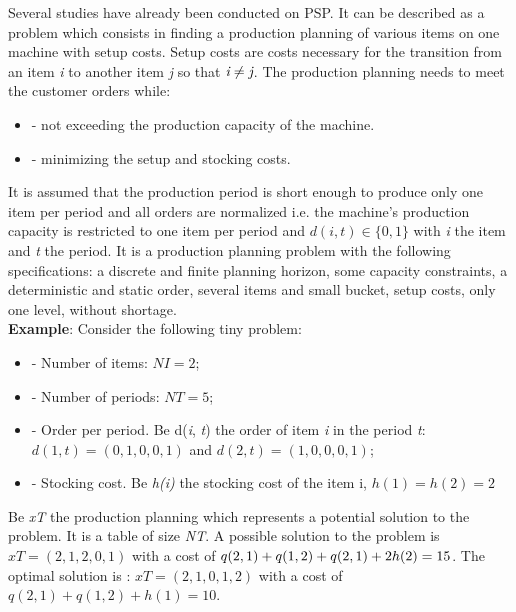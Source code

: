 \documentclass[twocolumn,10pt]{asme2ej}
\begin{document}
Several studies \cite{houndji_paper} \cite{ceschia_sa_paper} have already been conducted on PSP. It can be described as a problem which consists in finding a production planning of various items on one machine with setup costs. Setup costs are costs necessary for the transition from an item \emph{i} to another item \emph{j} so that $ \emph{i} \neq \emph{j} $. The production planning needs to meet the customer orders while:
\begin{itemize}
  \item - not exceeding the production capacity of the machine.
  \item - minimizing the setup and stocking costs.
\end{itemize}
It is assumed that the production period is short enough to produce only one item per period and all orders are normalized i.e. the machine's production capacity is restricted to one item per period and $ d(i, t) \in \{0, 1\} $ with \emph{i} the item and \emph{t} the period. It is a production planning problem with the following specifications: a discrete and finite planning horizon, some capacity constraints, a deterministic and static order, several items and small bucket, setup costs, only one level, without shortage.\\

\textbf{Example}: Consider the following tiny problem:
\begin{itemize}
    \item - Number of items: $ NI = 2 $;
    \item - Number of periods: $ NT = 5 $;
    \item - Order per period. Be d(\emph{i}, \emph{t}) the order of item \emph{i} in the period \emph{t}: $ d(1, t ) = (0, 1, 0, 0, 1) $ and $ d(2, t) = (1, 0, 0, 0, 1)$; 
    \item - Stocking cost. Be \emph{h(i)} the stocking cost of the item i, $ h(1) = h(2) = 2 $
\end{itemize}

    Be \emph{xT} the production planning which represents a potential solution to the problem. It is a table of size \emph{NT}. A possible solution to the problem is $ xT = (2, 1, 2, 0, 1) $ with a cost of $ q(2, 1) + q(1, 2) + q(2, 1) + 2 \* h(2) = 15 $. The optimal solution is : $ xT = (2, 1, 0, 1, 2) $ with a cost of $ q(2, 1) + q(1, 2) + h(1) = 10 $.
\end{document}
